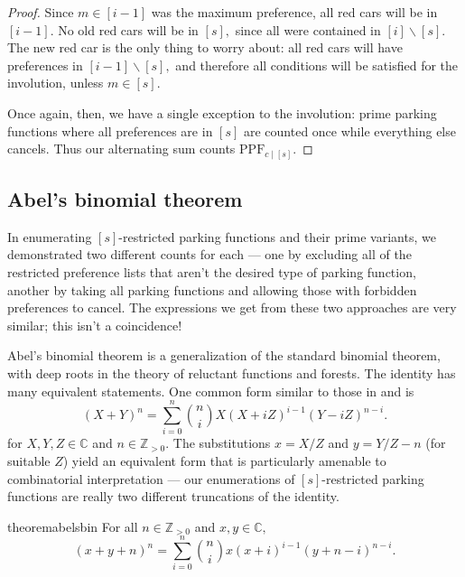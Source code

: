 \documentclass[12 pt]{amsart}
\theoremstyle{definition} %
\theoremstyle{remark} %
\begin{document}
\begin{proof}
    Since $m\in [i-1]$ was the maximum preference, all red cars will be in $[i-1]$. No old red cars will be in $[s],$ since all were contained in $[i]\backslash [s].$ The new red car is the only thing to worry about: all red cars will have preferences in $[i-1]\backslash [s],$ and therefore all conditions will be satisfied for the involution, unless $m\in [s].$

	Once again, then, we have a single exception to the involution: prime parking functions where all preferences are in $[s]$ are counted once while everything else cancels. Thus our alternating sum counts $\mathrm{PPF}_{c \mid [s]}$.
\end{proof}

\subsection{Abel's binomial theorem}

In enumerating $[s]$-restricted parking functions and their prime variants, we demonstrated two different counts for each --- one by excluding all of the restricted preference lists that aren't the desired type of parking function, another by taking all parking functions and allowing those with forbidden preferences to cancel. The expressions we get from these two approaches are very similar; this isn't a coincidence!

Abel's binomial theorem is a generalization of the standard binomial theorem, with deep roots in the theory of reluctant functions and forests. The identity has many equivalent statements. One common form similar to those in \cite{shapiro-1991} and \cite{zucker-2024} is
\[
	(X + Y)^{n} = \sum_{i = 0}^{n} \binom{n}{i} X (X + iZ)^{i - 1} (Y - i Z)^{n - i}.
\]
for $X, Y, Z \in \mathbb{C}$ and $n \in \mathbb{Z}_{> 0}$. The substitutions $x = X/Z$ and $y = Y/Z - n$ (for suitable $Z$) yield an equivalent form that is particularly amenable to combinatorial interpretation --- our enumerations of $[s]$-restricted parking functions are really two different truncations of the identity.

\begin{restatable}{theorem}{abelsbin}
	For all $n\in\mathbb{Z}_{>0}$ and $x,y\in\mathbb{C},$
    \[
		(x + y + n)^{n} = \sum_{i = 0}^{n} \binom{n}{i} x (x + i)^{i - 1} (y + n - i)^{n - i}.
	\]
\end{restatable}
\end{document}
